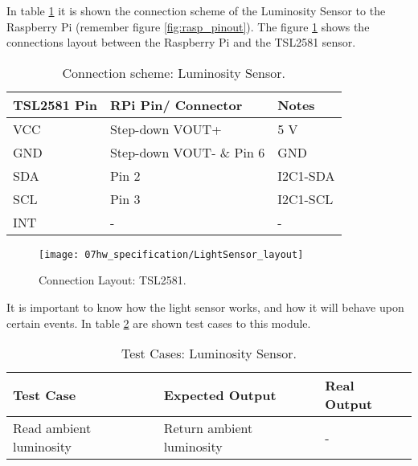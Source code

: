 
In table \ref{table:connect_lightsensor} it is shown the connection scheme of the Luminosity Sensor to the Raspberry Pi (remember figure \ref{fig:rasp_pinout}). The figure \ref{fig:LightLayout} shows the connections layout between the Raspberry Pi and the TSL2581 sensor.

\begin{table}[H]
	\centering
	\begin{tabular}{|m{3cm}|m{5cm}|m{3cm}|}
		\hline
		\textbf{TSL2581 Pin} & \textbf{RPi Pin/ Connector} & \textbf{Notes} 
		\\\hline\hline
		VCC & Step-down VOUT+ & 5 V
		\\\hline
		GND & Step-down VOUT- \& Pin 6 & GND
		\\\hline
		SDA & Pin 2 & I2C1-SDA
		\\\hline
		SCL & Pin 3 & I2C1-SCL
		\\\hline
		INT & - & -
		\\\hline
	\end{tabular}
	
	\caption{Connection scheme: Luminosity Sensor.}
	\label{table:connect_lightsensor}
\end{table}

\begin{figure}[H]
	\centering
	\texttt{[image: 07hw\_specification/LightSensor\_layout]}
	\caption{Connection Layout: TSL2581.}
	\label{fig:LightLayout}
\end{figure}


It is important to know how the light sensor works, and how it will behave upon certain events. In table \ref{table:test_light_sen} are shown test cases to this module.

\begin{table}[H]
	\centering
	\resizebox{\columnwidth}{!}
	{
		\begin{tabular}{|m{3cm}|m{5cm}||m{5cm}|}
			\hline
			\textbf{Test Case} & \textbf{Expected Output} & \textbf{Real Output}
			\\\hline\hline
			Read ambient luminosity & Return ambient luminosity  & -
			\\\hline
		\end{tabular}
	}
	\caption{Test Cases: Luminosity Sensor.}
	\label{table:test_light_sen}
\end{table}

